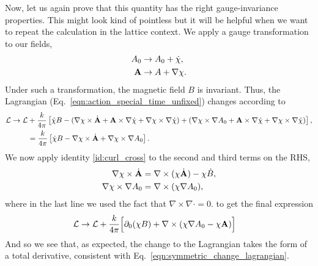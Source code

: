 \documentclass[11pt, oneside]{article} %
\numberwithin{equation}{section}
\begin{document}
Now, let us again prove that this quantity has the right gauge-invariance properties. This might look kind of pointless but it will be helpful when we want to repeat the calculation in the lattice context. We apply a gauge transformation to our fields,
\begin{align}
    A_0 &\rightarrow A_0 + \dot \chi, \\
    \textbf A & \rightarrow A + \nabla \chi.
\end{align}
Under such a transformation, the magnetic field $B$ is invariant. Thus, the Lagrangian (Eq.~\ref{eqn:action_special_time_unfixed}) changes according to
\begin{align}
    \mathcal L \rightarrow \mathcal L  &+ 
    \frac{k}{4\pi} \left [  
    \dot \chi  B 
    - (\nabla \chi \times \dot {\textbf A} 
    + \textbf A \times \nabla \dot \chi 
    + \nabla\chi \times \nabla \dot \chi)
    + (\nabla \chi \times \nabla A_0
    + \textbf A \times \nabla \dot \chi
    + \nabla \chi \times \nabla \dot \chi)
    \right ], \\
    & = 
    \frac{k}{4\pi} \left [  
    \dot \chi  B 
    - \nabla \chi \times \dot {\textbf A} 
    + \nabla \chi \times \nabla A_0
    \right ].\label{eqn:cont_intermediate_gauge}
\end{align}
We now apply identity \ref{id:curl_cross} to the second and third terms on the RHS,
\begin{align}
    \nabla \chi \times \dot {\textbf A} &= \nabla \times (\chi \dot{\textbf A}) - \chi \dot B, \\
    \nabla \chi \times \nabla  A_0 &= \nabla \times (\chi \nabla  A_0),
\end{align}
where in the last line we used the fact that $\nabla \times \nabla \cdot  = 0$. to get the final expression
\begin{align}
    \mathcal L \rightarrow \mathcal L  &+ \frac{k}{4\pi}
    \Big [
    \partial_0 (\chi B) + \nabla \times (\chi\nabla A_0 - \chi\textbf A)
    \Big ]
\end{align}
And so we see that, as expected, the change to the Lagrangian takes the form of a total derivative, consistent with Eq.~\ref{eqn:symmetric_change_lagrangian}.
\end{document}
